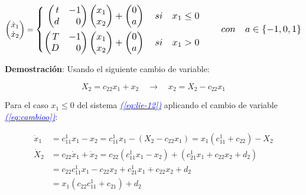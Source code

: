 \documentclass[12pt,a4paper]{report} %
\newcommand{\eref}[1]{\hyperref[#1]{\textcolor{blue}{\textit{(\ref*{#1})}}}}
\begin{document}
	\begin{equation}
		\begin{pmatrix*}[r]
			\dot{x}_1 \\ \dot{x}_2
		\end{pmatrix*}=
		\label{eq:lienard}
		\scalebox{1.2}{$\displaystyle
			\left\{
			\begin{aligned}
				\begin{pmatrix*}[r]
					t & -1\\
					d & 0
				\end{pmatrix*}\begin{pmatrix*}[r]
				x_1\\x_2
				\end{pmatrix*}+\begin{pmatrix}
				0\\a
				\end{pmatrix} \quad si \quad x_1\leq 0 \\
				\begin{pmatrix*}[r]
					T & -1\\
					D & 0
				\end{pmatrix*}\begin{pmatrix*}[r]
				x_1\\x_2
				\end{pmatrix*}+\begin{pmatrix}
					0\\a
				\end{pmatrix} \quad si \quad x_1 > 0
			\end{aligned}
			\right. \qquad con\quad a \in \left\{-1,0,1\right\}
			$}
	\end{equation}\smallskip

	
	\textbf{Demostración}: Usando el siguiente cambio de variable:
	
	\begin{equation}
		\label{eq:cambioo}
		X_2=c_{22}x_1+x_2\quad \rightarrow \quad x_2=X_2-c_{22}x_1
	\end{equation}\smallskip
	
	Para el caso $x_1\leq 0$ del sistema \eref{eq:lie-12} aplicando el cambio de variable \eref{eq:cambioo}:
	
		\begin{equation}
		\label{eq:cambio2}
		\begin{aligned}
			\dot{x}_1&=c_{11}^1x_1-x_2=c_{11}^1x_1-(X_2-c_{22}x_1)=x_1(c_{11}^1+c_{22})-X_2 \\[2mm]
			\dot{X}_2&=c_{22}\dot{x}_1+\dot{x}_2=c_{22}(c_{11}^1x_1-x_2)+(c_{21}^1x_1+c_{22}x_2+d_2) \\[2mm]
			&=c_{22}c_{11}^1x_1-c_{22}x_2+c_{21}^1x_1+c_{22}x_2+d_2 \\[2mm]
			&=x_1(c_{22}c_{11}^1+c_{21})+d_2
		\end{aligned}
		\end{equation}\smallskip
	
\end{document}
